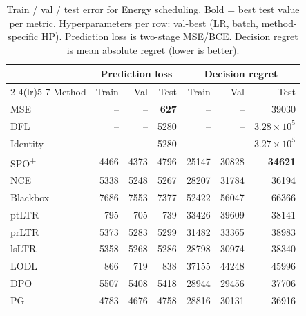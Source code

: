 \begin{table}[t]
\centering
\caption[Train/val/test error for Energy scheduling.]{Train / val / test error for Energy scheduling. Bold = best test value per metric. Hyperparameters per row: val-best (LR, batch, method-specific HP). Prediction loss is two-stage MSE/BCE. Decision regret is mean absolute regret (lower is better).}
\label{tab:err-energy}
\setlength{\tabcolsep}{4pt}
\renewcommand{\arraystretch}{1.05}
\begin{tabular}{@{}lrrrrrr@{}}
\toprule
& \multicolumn{3}{c}{Prediction loss} & \multicolumn{3}{c}{Decision regret} \\
\cmidrule(lr){2-4}\cmidrule(lr){5-7}
Method & Train & Val & Test & Train & Val & Test \\
\midrule
MSE & -- & -- & \textbf{627} & -- & -- & 39030 \\
DFL & -- & -- & 5280 & -- & -- & $3.28{\times}10^{5}$ \\
Identity & -- & -- & 5280 & -- & -- & $3.27{\times}10^{5}$ \\
SPO\textsuperscript{+} & 4466 & 4373 & 4796 & 25147 & 30828 & \textbf{34621} \\
NCE & 5338 & 5248 & 5267 & 28207 & 31784 & 36194 \\
Blackbox & 7686 & 7553 & 7377 & 52422 & 56047 & 66366 \\
ptLTR & 795 & 705 & 739 & 33426 & 39609 & 38141 \\
prLTR & 5373 & 5283 & 5299 & 31482 & 33365 & 38983 \\
lsLTR & 5358 & 5268 & 5286 & 28798 & 30974 & 38340 \\
LODL & 866 & 719 & 838 & 37155 & 44248 & 45996 \\
DPO & 5507 & 5408 & 5418 & 28944 & 29456 & 37706 \\
PG & 4783 & 4676 & 4758 & 28816 & 30131 & 36916 \\
\bottomrule
\end{tabular}
\end{table}


